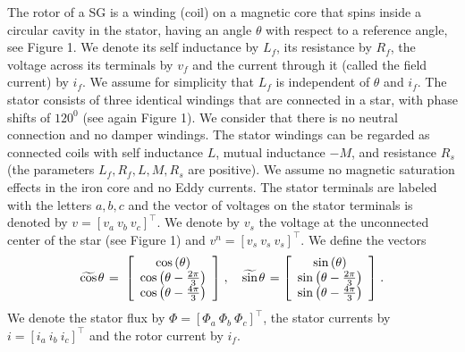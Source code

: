 \documentclass[letterpaper, 10 pt, conference]{ieeeconf}  %
\newcommand{\m}      {{\hbox{\hskip 1pt}}}
\begin{document}
The rotor of a SG is a winding (coil) on a magnetic core that spins
inside a circular cavity in the stator, having an angle $\theta$ with
respect to a reference angle, see Figure 1. We denote its self
inductance by $L_f$, its resistance by $R_f$, the voltage across its
terminals by $v_f$ and the current through it (called the field
current) by $i_f$. We assume for simplicity that $L_f$ is independent
of $\theta$ and $i_f$. The stator consists of three identical windings
that are connected in a star, with phase shifts of $120^0$ (see again
Figure 1). We consider that there is no neutral connection and no
damper windings. The stator windings can be regarded as connected
coils with self inductance $L$, mutual inductance $-M$, and resistance
$R_s$ (the parameters $L_f,R_f,L,M,R_s$ are positive). We assume no
magnetic saturation effects in the iron core and no Eddy currents. The
stator terminals are labeled with the letters $a,b,c$ and the vector
of voltages on the stator terminals is denoted by $v=\left[v_a\ v_b\
v_c\right]^\top$. We denote by $v_s$ the voltage at the unconnected 
center of the star (see Figure 1) and $v^n=[v_s\ v_s\ v_s]^\top$.
We define the vectors
$$ \widetilde{\cos}\m\theta \m=\m \left[\begin{array}{c} \cos\left(
   \theta\right)\\ \cos\left(\theta-\frac{2\pi}{3}\right)\\
   \cos\left(\theta-\frac{4\pi}{3}\right) \end{array}\right] \m,\quad
   \widetilde{\sin}\m\theta \m= \left[\begin{array}{c} \sin\left(
   \theta\right)\\ \sin\left(\theta-\frac{2\pi}{3}\right)\\ \sin\left
   (\theta-\frac{4\pi}{3}\right) \end{array}\right] \m.$$
We denote the stator flux by $\Phi=\left[\Phi_a\ \Phi_b\ \Phi_c
\right]^\top$, the stator currents by $i=\left[i_a\ i_b\ i_c\right]
^\top$ and the rotor current by $i_f$. 
\end{document}
